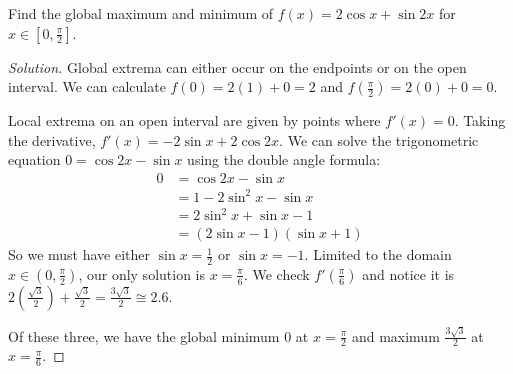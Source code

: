 \documentclass{agony}
\begin{document}
\question Find the global maximum and minimum of $f(x)=2\cos x + \sin 2x$ for $x \in [0,\frac\pi2]$.
\begin{proof}[Solution]
  Global extrema can either occur on the endpoints or on the open interval.
  We can calculate $f(0) = 2(1)+0 = 2$ and $f(\frac\pi2) = 2(0) + 0 = 0$.

  Local extrema on an open interval are given by points where $f'(x)=0$.
  Taking the derivative, $f'(x) = -2\sin x + 2\cos 2x$.
  We can solve the trigonometric equation $0 = \cos 2x - \sin x$ using the double angle formula:
  \begin{align*}
    0 & = \cos 2x - \sin x          \\
      & = 1 - 2\sin^2 x - \sin x    \\
      & = 2\sin^2 x + \sin x - 1    \\
      & = (2\sin x - 1)(\sin x + 1)
  \end{align*}
  So we must have either $\sin x = \frac12$ or $\sin x = -1$.
  Limited to the domain $x\in(0, \frac\pi2)$, our only solution is $x = \frac\pi6$.
  We check $f'(\frac\pi6)$ and notice it is
  $2(\frac{\sqrt{3}}{2}) + \frac{\sqrt{3}}{2} = \frac{3\sqrt{3}}{2} \cong 2.6$.

  Of these three, we have the global minimum $0$ at $x=\frac\pi2$
  and maximum $\frac{3\sqrt{3}}{2}$ at $x=\frac\pi6$.
\end{proof}
\end{document}
